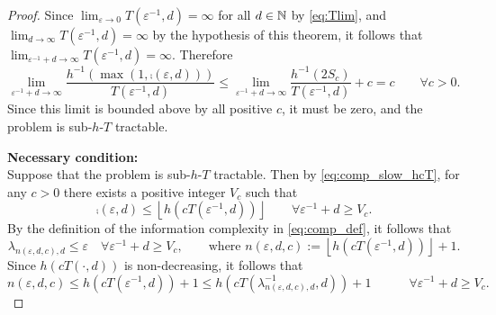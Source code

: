 \documentclass[sort&compress]{elsarticle}
\begin{document}
\begin{proof}
Since $\lim_{\varepsilon \to 0} T(\varepsilon^{-1},d) = \infty$ for all $d \in \mathbb{N}$ by \eqref{eq:Tlim}, and  $\lim_{d \to \infty} T(\varepsilon^{-1},d) = \infty$ by the hypothesis of this theorem, it follows that $\lim_{\varepsilon^{-1} + d \to \infty} T(\varepsilon^{-1},d) = \infty$.  Therefore
\begin{equation*}
	\lim_{\varepsilon^{-1} + d \to \infty} \frac{h^{-1}(\max(1,\comp(\varepsilon,d)))}{T(\varepsilon^{-1},d)}
	\le \lim_{\varepsilon^{-1} + d \to \infty} \frac{h^{-1} (2 S_c)}{T(\varepsilon^{-1},d)}  + c = c \qquad\forall c >  0.
\end{equation*}
Since this limit is bounded above by all positive $c$, it must be zero, and the problem is sub-$h$-$T$ tractable.


\bigskip

\noindent \textbf{Necessary condition:}\\
Suppose that the problem is  sub-$h$-$T$ tractable. Then by \eqref{eq:comp_slow_hcT}, for any $c>0$ there exists a positive integer $V_c$ such that
\begin{equation*}
	\comp(\varepsilon,d) \le \left\lfloor h(cT(\varepsilon^{-1},d)) \right\rfloor \qquad \forall \varepsilon^{-1} + d \ge V_c.
\end{equation*}
By the definition of the information complexity in \eqref{eq:comp_def}, it follows that
\[
	\lambda_{n(\varepsilon,d,c),d} \le \varepsilon \quad \forall \varepsilon^{-1} + d \ge V_c, \qquad \text{where }
	n(\varepsilon,d,c):=\left\lfloor h(cT(\varepsilon^{-1},d)) \right\rfloor +1.
\]
Since $h(cT(\cdot,d))$ is non-decreasing, it follows that
\begin{equation}
		n(\varepsilon,d,c)\le  h(cT(\varepsilon^{-1},d)) +1\le  h(cT(\lambda^{-1}_{n(\varepsilon,d,c),d},d)) +1\qquad  \quad \forall \varepsilon^{-1} + d \ge V_c. \label{eq:nedcbound}
\end{equation}



\end{proof}
\end{document}
